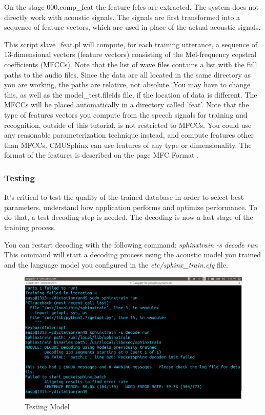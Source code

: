 \documentclass[12pt,a4paper,oneside]{memoir}
\begin{document}
 On the stage 000.comp\_feat the feature feles are extracted. The system does not directly work with acoustic signals. The signals are first transformed into a sequence of feature vectors, which are used in place of the actual acoustic signals.

This script slave\_feat.pl will compute, for each training utterance, a sequence of 13-dimensional vectors (feature vectors) consisting of the Mel-frequency cepstral coefficients (MFCCs). Note that the list of wave files contains a list with the full paths to the audio files. Since the data are all located in the same directory as you are working, the paths are relative, not absolute. You may have to change this, as well as the model\_test.fileids file, if the location of data is different. The MFCCs will be placed automatically in a directory called 'feat'. Note that the type of features vectors you compute from the speech signals for training and recognition, outside of this tutorial, is not restricted to MFCCs. You could use any reasonable parameterization technique instead, and compute features other than MFCCs. CMUSphinx can use features of any type or dimensionality. The format of the features is described on the page MFC Format . 

\subsubsection{Testing}
 It's critical to test the quality of the trained database in order to select best parameters, understand how application performs and optimize performance. To do that, a test decoding step is needed. The decoding is now a last stage of the training process.

You can restart decoding with the following command: 
\textit{sphinxtrain -s decode run}
 This command will start a decoding process using the acoustic model you trained and the language model you configured in the \textit{etc/sphinx\_train.cfg} file.

\begin{figure}[h]
    \centering
    \includegraphics[scale=0.3]{Screenshot4}
    \caption{Testing Model}
\end{figure}
\end{document}
